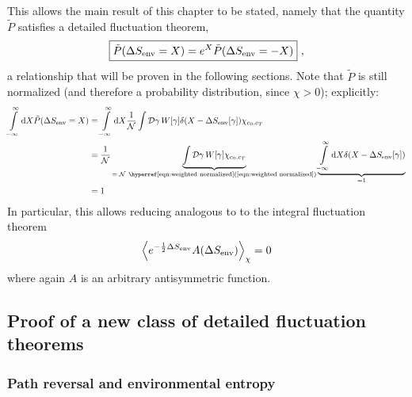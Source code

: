 This allows the main result of this chapter to be stated, namely that the quantity \(\tilde P\) satisfies a detailed fluctuation theorem,
%
\begin{equation}
	\label{eqn:SEnv fluctuation theorem}
	\boxed{
		\tilde P(\Delta S_\text{env} = X) = e^X \tilde P(\Delta S_\text{env} = -X)
	}~,
\end{equation}
%
a relationship that will be proven in the following sections.
Note that \(\tilde P\) is still normalized (and therefore a probability distribution, since \(\chi > 0\)); explicitly:
\begin{equation}
	\begin{split}
	   \inflint\d X \tilde P(\Delta\SEnv = X)
	&= \inflint\d X \frac1{\Cal N} \int\Cal D\gamma \, W[\gamma] \delta(X-\Delta\SEnv[\gamma]) \chi_{c_0,c_T}
	\\
	&=  \frac1{\Cal N} \underbrace{\int\Cal D\gamma \, W[\gamma] \chi_{c_0,c_T}}_{=\; \Cal N ~ \text{\RefEqn{eqn:weighted normalized}}}
	    \underbrace{\inflint\d X \delta(X-\Delta\SEnv[\gamma])}_{=1}  \\
	&= 1
	\end{split}
\end{equation}
%
In particular, this allows reducing  analogous to  to the integral fluctuation theorem
\begin{equation}
	\label{eqn:SEnv asymmetric average}
	\left\langle e^{-\frac12\Delta S_\text{env}} A(\Delta S_\text{env})\right\rangle_\chi = 0
\end{equation}
%
where again \(A\) is an arbitrary antisymmetric function.





\subsection{Proof of a new class of detailed fluctuation theorems}



\subsubsection{Path reversal and environmental entropy}

